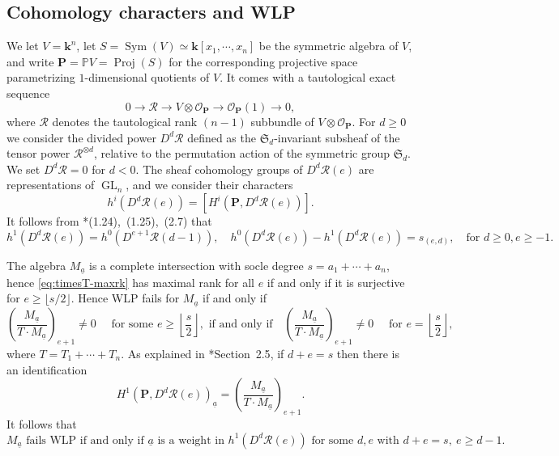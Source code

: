 \documentclass[11pt,reqno]{amsart}
\def\kk{{\mathbf k}}
\newcommand{\oo}{\otimes}
\newcommand{\GL}{\operatorname{GL}}
\newcommand{\Sym}{\operatorname{Sym}}
\newcommand{\bb}[1]{\mathbb{#1}}
\newcommand{\mc}[1]{\mathcal{#1}}
\newcommand{\mf}[1]{\mathfrak{#1}}
\newcommand{\op}[1]{\operatorname{#1}}
\newcommand{\ul}[1]{\underline{#1}}
\def\PP{{\mathbf P}}
\def\lra{\longrightarrow}
\theoremstyle{definition}
\theoremstyle{remark}
\numberwithin{equation}{section}
\begin{document}
\subsection{Cohomology characters and WLP}
\label{subsec:coh-WLP}

We let $V=\kk^n$, let $S=\Sym(V) \simeq \kk[x_1,\cdots,x_n]$ be the symmetric algebra of $V$, and write $\PP=\bb{P}V=\op{Proj}(S)$ for the corresponding projective space parametrizing $1$-dimensional quotients of $V$. It comes with a tautological exact sequence
\begin{equation}\label{eq:ses-on-PV}
0 \lra \mc{R} \lra V \oo \mc{O}_{\PP} \lra \mc{O}_{\PP}(1) \lra 0,
\end{equation}
where $\mc{R}$ denotes the tautological rank $(n-1)$ subbundle of $V \oo \mc{O}_{\PP}$. For $d\geq 0$ we consider the divided power $D^d\mc{R}$ defined as the $\mf{S}_d$-invariant subsheaf of the tensor power $\mc{R}^{\oo d}$, relative to the permutation action of the symmetric group $\mf{S}_d$. We set $D^d\mc{R}=0$ for $d<0$. The sheaf cohomology groups of $D^d\mc{R}(e)$ are representations of $\GL_n$, and we consider their characters
\[ h^i(D^d\mc{R}(e)) = \left[H^i(\PP,D^d\mc{R}(e))\right].\]
It follows from \cite{KMRR}*{(1.24),\ (1.25),\ (2.7)} that
\begin{equation}\label{eq:identities-hiDdre}
    h^1(D^d\mc{R}(e)) = h^0(D^{e+1}\mc{R}(d-1)),\quad h^0(D^d\mc{R}(e))-h^1(D^d\mc{R}(e)) = s_{(e,d)},\quad\text{for }d\geq 0,e\geq -1.
\end{equation}


The algebra $M_{\ul{a}}$ is a complete intersection with socle degree $s=a_1+\cdots+a_n$, hence \eqref{eq:timesT-maxrk} has maximal rank for all $e$ if and only if it is surjective for $e\geq \lfloor s/2\rfloor$. Hence WLP fails for $M_{\ul{a}}$ if and only if
\[ \left(\frac{M_{\ul{a}}}{T\cdot M_{\ul{a}}}\right)_{e+1} \neq 0 \quad\text{ for some }e \geq \left\lfloor\frac{s}{2}\right\rfloor,\text{ if and only if}\quad\left(\frac{M_{\ul{a}}}{T\cdot M_{\ul{a}}}\right)_{e+1} \neq 0 \quad\text{ for }e = \left\lfloor\frac{s}{2}\right\rfloor,\]
where $T=T_1+\cdots+T_n$. As explained in \cite{KMRR}*{Section~2.5}, if $d+e=s$ then there is an identification
\[H^1(\PP,D^d\mc{R}(e))_{\ul{a}} = \left(\frac{M_{\ul{a}}}{T\cdot M_{\ul{a}}}\right)_{e+1}.\]
It follows that 
\begin{equation}\label{eq:coh-characterization-WLP}
\text{$M_{\ul{a}}$ fails WLP if and only if $\ul{a}$ is a weight in } h^1(D^d\mc{R}(e))\text{ for some }d,e\text{ with }d+e=s,\ e\geq d-1.
\end{equation}
\end{document}
